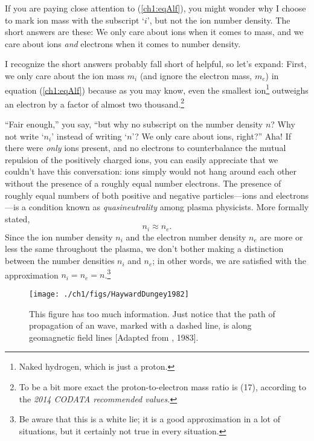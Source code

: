 If you are paying close attention to (\ref{ch1:eqAlf}), you might wonder why I
choose to mark ion mass with the subscript `$i$', but not the ion number
density. The short answers are these: We only care about ions when it comes to
mass, and we care about ions \emph{and} electrons when it comes to number
density.

I recognize the short answers probably fall short of helpful, so let's expand:
First, we only care about the ion mass $m_i$ (and ignore the electron mass,
$m_e$) in equation (\ref{ch1:eqAlf}) because as you may know, even the smallest
ion\footnote{Naked hydrogen, which is just a proton.} outweighs an electron by a
factor of almost two thousand.\footnote{To be a bit more exact the
  proton-to-electron mass ratio is (17), according to
  the \textsl{2014 CODATA recommended values.}}

``Fair enough,'' you say, ``but why no subscript on the number density $n$?  Why
not write `$n_i$' instead of writing `$n$'? We only care about ions, right?''
Aha! If there were \emph{only} ions present, and no electrons to counterbalance
the mutual repulsion of the positively charged ions, you can easily appreciate
that we couldn't have this conversation: ions simply would not hang around each
other without the presence of a roughly equal number electrons. The presence of
roughly equal numbers of both positive and negative particles---ions and
electrons---is a condition known as \emph{quasineutrality} among plasma
physicists. More formally stated,
\begin{equation}
  \label{ch1:eqQuasi}
  n_i \approx n_e.
\end{equation}
Since the ion number density $n_i$ and the electron number density $n_e$ are
more or less the same throughout the plasma, we don't bother making a
distinction between the number densities $n_i$ and $n_e$; in other words, we are
satisfied with the approximation $n_i = n_e = n$.\footnote{Be aware that this
  is a white lie; it is a good approximation in a lot of situations, but it
  certainly not true in every situation.}



\begin{figure}
  \centering
  \noindent\texttt{[image: ./ch1/figs/HaywardDungey1982]}
  \caption[\Alf wave propagation]{This figure has too much information. Just
    notice that the path of propagation of an \Alf wave, marked with a dashed
    line, is along geomagnetic field lines [Adapted from
    \citeauthor{Hayward1983}, 1983].}
  \label{ch1:FigAlfProp}
\end{figure}

